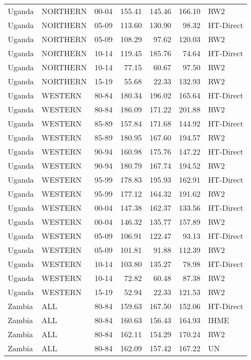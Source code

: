 \begin{longtable}{lllrrrl}
  Uganda & NORTHERN & 00-04 & 155.41 & 145.46 & 166.10 & RW2 \\ 
  Uganda & NORTHERN & 05-09 & 113.60 & 130.90 & 98.32 & HT-Direct \\ 
  Uganda & NORTHERN & 05-09 & 108.29 & 97.62 & 120.03 & RW2 \\ 
  Uganda & NORTHERN & 10-14 & 119.45 & 185.76 & 74.64 & HT-Direct \\ 
  Uganda & NORTHERN & 10-14 & 77.15 & 60.67 & 97.50 & RW2 \\ 
  Uganda & NORTHERN & 15-19 & 55.68 & 22.33 & 132.93 & RW2 \\ 
  Uganda & WESTERN & 80-84 & 180.34 & 196.02 & 165.64 & HT-Direct \\ 
  Uganda & WESTERN & 80-84 & 186.09 & 171.22 & 201.88 & RW2 \\ 
  Uganda & WESTERN & 85-89 & 157.84 & 171.68 & 144.92 & HT-Direct \\ 
  Uganda & WESTERN & 85-89 & 180.95 & 167.60 & 194.57 & RW2 \\ 
  Uganda & WESTERN & 90-94 & 160.98 & 175.76 & 147.22 & HT-Direct \\ 
  Uganda & WESTERN & 90-94 & 180.79 & 167.74 & 194.52 & RW2 \\ 
  Uganda & WESTERN & 95-99 & 178.83 & 195.93 & 162.91 & HT-Direct \\ 
  Uganda & WESTERN & 95-99 & 177.12 & 164.32 & 191.62 & RW2 \\ 
  Uganda & WESTERN & 00-04 & 147.38 & 162.37 & 133.56 & HT-Direct \\ 
  Uganda & WESTERN & 00-04 & 146.32 & 135.77 & 157.89 & RW2 \\ 
  Uganda & WESTERN & 05-09 & 106.91 & 122.47 & 93.13 & HT-Direct \\ 
  Uganda & WESTERN & 05-09 & 101.81 & 91.88 & 112.39 & RW2 \\ 
  Uganda & WESTERN & 10-14 & 103.80 & 135.27 & 78.98 & HT-Direct \\ 
  Uganda & WESTERN & 10-14 & 72.82 & 60.48 & 87.38 & RW2 \\ 
  Uganda & WESTERN & 15-19 & 52.94 & 22.33 & 121.53 & RW2 \\ 
  Zambia & ALL & 80-84 & 159.63 & 167.50 & 152.06 & HT-Direct \\ 
  Zambia & ALL & 80-84 & 160.63 & 156.43 & 164.93 & IHME \\ 
  Zambia & ALL & 80-84 & 162.11 & 154.29 & 170.24 & RW2 \\ 
  Zambia & ALL & 80-84 & 162.09 & 157.42 & 167.22 & UN \\ 

\end{longtable}
